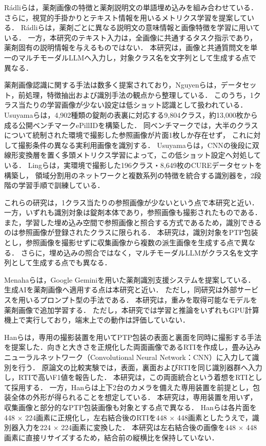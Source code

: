 \documentclass[uplatex,dvipdfmx]{jsarticle}
\begin{document}
Rádliらは，薬剤画像の特徴と薬剤説明文の単語埋め込みを組み合わせている\cite{radli2024word}．
さらに，視覚的手掛かりとテキスト情報を用いるメトリクス学習を提案している\cite{radli2024metric}．
Rádliらは，薬剤ごとに異なる説明文の意味情報と画像特徴を学習に用いている．
一方，本研究のテキスト入力は，全画像に共通するタスク指示であり，薬剤固有の説明情報を与えるものではない．
本研究は，画像と共通質問文を単一のマルチモーダルLLMへ入力し，対象クラス名を文字列として生成する点で異なる．

薬剤画像認識に関する手法は数多く提案されており，Nguyenらは，データセット，前処理，特徴抽出および識別手法の観点から整理している\cite{nguyen2025pillreview}．
このうち，1クラス当たりの学習画像が少ない設定は低ショット認識として扱われている．
Usuyamaらは，4,902種類の錠剤の表裏に対応する9,804クラス，約13,000枚から成る公開ベンチマークePillIDを構築した\cite{usuyama2020epillid}．
同ベンチマークでは，大半のクラスについて統制された環境で撮影した参照画像が片面1枚しか存在せず，
これに対して撮影条件の異なる実利用画像を識別する．
Usuyamaらは，CNNの後段に双線形変換層を置く多頭メトリクス学習によって，この低ショット設定へ対処している．
Lingらは，実環境で撮影した196クラス・8,649枚のCUREデータセットを構築し，
領域分割用のネットワークと複数系列の特徴を統合する識別器を，2段階の学習手順で訓練している\cite{ling2020fewshot}．

これらの研究は，1クラス当たりの参照画像が少ないという点で本研究と近い．
一方，いずれも識別対象は錠剤本体であり，参照画像も撮影されたものである．
また，学習した埋め込み空間で参照画像と照合する方式であるため，識別できるのは参照画像が登録されたクラスに限られる．
本研究は，識別対象をPTP包装とし，参照画像を撮影せずに収集画像から複数の派生画像を生成する点で異なる．
さらに，埋め込みの照合ではなく，マルチモーダルLLMがクラス名を文字列として生成する点でも異なる．

Menahaらは，Google Geminiを用いた薬剤識別支援システムを提案している\cite{menaha2024gemini}．
生成AIを薬剤画像へ適用する点は本研究と近い．
ただし，同研究は外部サービスを用いるプロンプト型の手法である．
本研究は，重みを取得可能なモデルを薬剤画像で追加学習する．
ただし，本研究では学習と推論をいずれもGPU計算機上で実行しており，端末上での動作は評価していない．

Hanらは，専用の撮影装置を用いてPTP包装の表面と裏面を同時に撮影する手法を提案した\cite{han2021blister}．向きと大きさを正規化した両面画像であるRTIを作成し，畳み込みニューラルネットワーク（Convolutional Neural Network：CNN）に入力して識別を行う．
原論文の比較実験では，表面，裏面およびRTIを同じ識別器群へ入力し，RTIで高いF1値を報告した．
本研究は，この両面統合という着想をRTIとして採用する．
一方，Hanらは上下2台のカメラを備えた専用装置を前提とし，包装全体の外形が得られることを想定している．
本研究は，専用装置を用いず，収集画像と部分的なPTP包装画像も対象とする点で異なる．
Hanらは各片面を448 $\times$ 224画素に正規化し，左右結合後のRTIを448 $\times$ 448画素としたうえで，識別器入力を224 $\times$ 224画素に変換した．
本研究は左右結合後の画像を448 $\times$ 448画素に直接リサイズするため，結合前の縦横比を保持していない．
\end{document}
